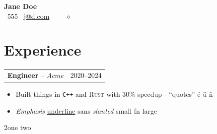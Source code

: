 \documentclass[10pt,letterpaper]{article}
\begin{document}
\begin{center}{\huge\textbf{Jane Doe}}\\ \faPhone\ 555 \quad \faEnvelope\ \href{mailto:j@d.com}{j@d.com} \quad \faGithub\ \faLinkedin\ \Letter\ \Mobilefone\ $\diamond$ \end{center}
\section{Experience}
\begin{tabularx}{\textwidth}{X r}\textbf{Engineer} -- \textit{Acme} & 2020--2024\end{tabularx}
\begin{itemize}[leftmargin=*,noitemsep]
\item Built things in \texttt{C++} and \textsc{Rust} with 30\% speedup—“quotes” é ü ñ
\item \emph{Emphasis} \underline{underline} \textsf{sans} \textsl{slanted} {\small small} {\footnotesize fn} {\Large large}
\end{itemize}
\begin{multicols}{2}\noindent one \columnbreak two\end{multicols}
\end{document}
